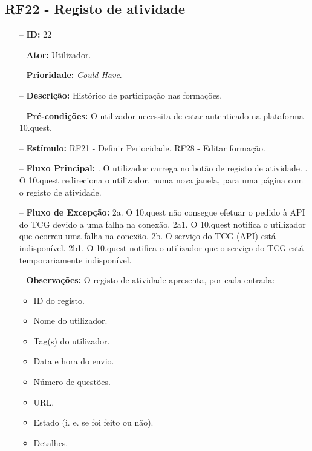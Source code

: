 \subsection{RF22 - Registo de atividade}
\begin{itemize}
	\item[--] \textbf{ID:} 22
	\item[--]  \textbf{Ator:} Utilizador.
	\item[--]  \textbf{Prioridade:} \textit{Could Have}.
	\item[--]  \textbf{Descrição:} Histórico de participação nas formações.
	\item[--]  \textbf{Pré-condições:} O utilizador necessita de estar autenticado na plataforma 10.quest.
	\item[--]  \textbf{Estímulo:}
		\subitem RF21 - Definir Periocidade.
		\subitem RF28 - Editar formação.
	\item[--]  \textbf{Fluxo Principal:} 
		. O utilizador carrega no botão de registo de atividade.
		. O 10.quest redireciona o utilizador, numa nova janela, para uma página com o registo de atividade.
	\item[--]  \textbf{Fluxo de Excepção:} 
		\subitem 2a. O 10.quest não consegue efetuar o pedido à API do TCG devido a uma falha na conexão.
		\subitem 2a1. O 10.quest notifica o utilizador que ocorreu uma falha na conexão.
		\subitem 2b. O serviço do TCG (API) está indisponível.
		\subitem 2b1. O 10.quest notifica o utilizador que o serviço do TCG está temporariamente indisponível. 
	\item[--]  \textbf{Observações:} O registo de atividade apresenta, por cada entrada:
	\begin{itemize}
		\item ID do registo.
		\item Nome do utilizador.
		\item Tag(s) do utilizador.
		\item Data e hora do envio.
		\item Número de questões.
		\item URL.
		\item Estado (i. e. se foi feito ou não).
		\item Detalhes.
	\end{itemize}
\end{itemize}
\newpage

